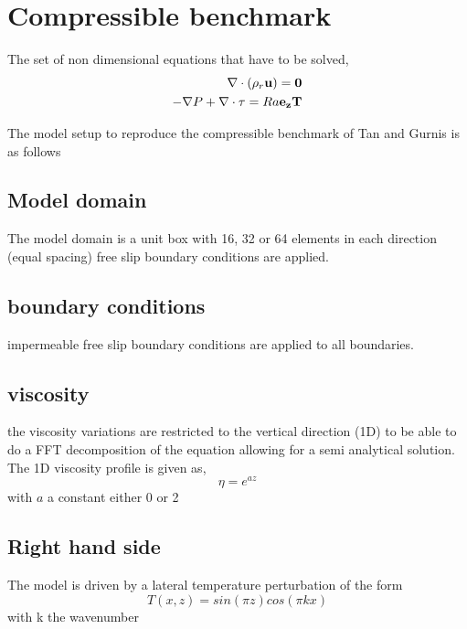\section{Compressible benchmark}
The set of non dimensional equations that have to be solved,
\begin{eqnarray}
 \nabla \cdot (\rho_{r}\bf u) = 0 \\
-\nabla P + \nabla \cdot \tau = Ra \bf e_{z} T
\end{eqnarray} 

The model setup to reproduce the compressible benchmark of Tan and Gurnis is as follows

\subsection{Model domain}
The model domain is a unit box with 16, 32 or 64 elements in each direction (equal spacing)
free slip boundary conditions are applied.
\subsection{boundary conditions}
impermeable free slip boundary conditions are applied to all boundaries.
\subsection{viscosity}
the viscosity variations are restricted to the vertical direction (1D) to be able to do a FFT decomposition of the equation allowing for a semi analytical solution.
The 1D viscosity profile is given as,
\begin{equation}
\eta = e^{az}
\end{equation} 
with $a$ a constant either 0 or 2 
\subsection{Right hand side}
The model is driven by a lateral temperature perturbation of the form 
\begin{equation}
T(x,z) = sin(\pi z)cos(\pi k x)
\end{equation}
with k the wavenumber
